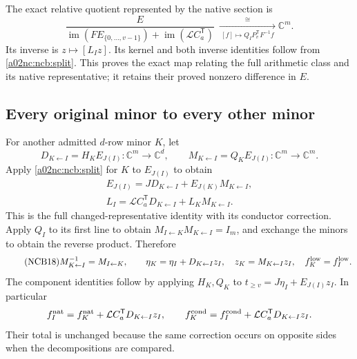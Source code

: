 \documentclass[11pt,a4paper]{article}
\begin{document}
The exact relative quotient represented by the native section is
\begin{equation}\tag{NCB15}\label{a02nc:ncb:relative}
\frac{E}
 {\operatorname{im}(FE_{\{0,\ldots,v-1\}})
          +\operatorname{im}(\mathcal LC_a^{\mathsf T})}
\ \xrightarrow[\ [f]\mapsto Q_IP_v^{\mathsf T}F^{-1}f\ ]{\ \cong\ }
\mathbb C^m .
\end{equation}
Its inverse is $z\mapsto[L_Iz]$. Its kernel and both inverse identities
follow from \eqref{a02nc:ncb:split}. This proves the exact map relating the
full arithmetic class and its native representative; it retains their
proved nonzero difference in $E$.

\subsection{Every original minor to every other minor}
For another admitted $d$-row minor $K$, let
\begin{equation}\tag{NCB16}\label{a02nc:ncb:transition}
D_{K\leftarrow I}=H_KE_{J(I)}:\mathbb C^m\to\mathbb C^d,\qquad
M_{K\leftarrow I}=Q_KE_{J(I)}:\mathbb C^m\to\mathbb C^m .
\end{equation}
Apply \eqref{a02nc:ncb:split} for $K$ to $E_{J(I)}$ to obtain
\begin{equation}\tag{NCB17}\label{a02nc:ncb:section-transition}
\begin{gathered}
E_{J(I)}=JD_{K\leftarrow I}
              +E_{J(K)}M_{K\leftarrow I},\\
L_I=\mathcal LC_a^{\mathsf T}D_{K\leftarrow I}
              +L_KM_{K\leftarrow I}.
\end{gathered}
\end{equation}
This is the full changed-representative identity with its conductor
correction. Apply $Q_I$ to its first line to obtain
$M_{I\leftarrow K}M_{K\leftarrow I}=I_m$, and exchange the minors
to obtain the reverse product. Therefore
\begin{equation}\tag{NCB18}\label{a02nc:ncb:inverse}
M_{K\leftarrow I}^{-1}=M_{I\leftarrow K},\qquad
\eta_K=\eta_I+D_{K\leftarrow I}z_I,\quad
z_K=M_{K\leftarrow I}z_I,\quad
f_K^{\rm low}=f_I^{\rm low}.
\end{equation}
The component identities follow by applying $H_K,Q_K$ to
$t_{\geq v}=J\eta_I+E_{J(I)}z_I$. In particular
\[
f_I^{\rm nat}=f_K^{\rm nat}
       +\mathcal LC_a^{\mathsf T}D_{K\leftarrow I}z_I,\qquad
f_K^{\rm cond}=f_I^{\rm cond}
       +\mathcal LC_a^{\mathsf T}D_{K\leftarrow I}z_I.
\]
Their total is unchanged because the same correction occurs on
opposite sides when the decompositions are compared.
\end{document}

